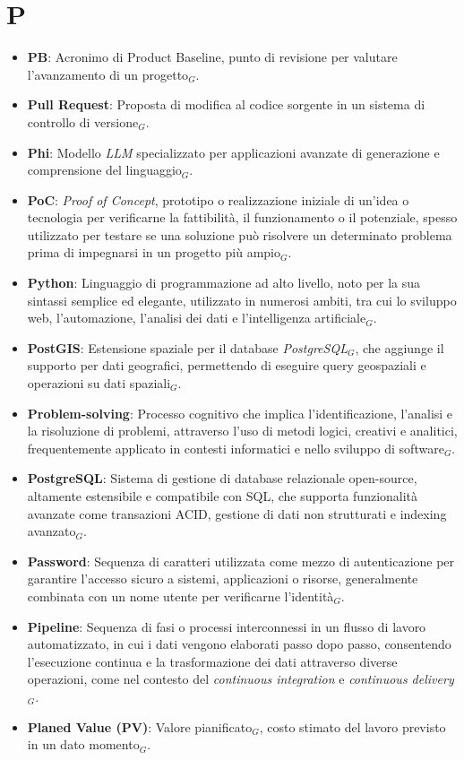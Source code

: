 \section{P}
\begin{itemize}
    \item \textbf{PB}: Acronimo di Product Baseline, punto di revisione per valutare l'avanzamento di un progetto$_G$.
    \item \textbf{Pull Request}: Proposta di modifica al codice sorgente in un sistema di controllo di versione$_G$.
    \item \textbf{Phi}: Modello \textit{LLM} specializzato per applicazioni avanzate di generazione e comprensione del linguaggio$_G$.
    \item \textbf{PoC}: \textit{Proof of Concept}, prototipo o realizzazione iniziale di un'idea o tecnologia per verificarne la fattibilità, il funzionamento o il potenziale, spesso utilizzato per testare se una soluzione può risolvere un determinato problema prima di impegnarsi in un progetto più ampio$_G$.
    \item \textbf{Python}: Linguaggio di programmazione ad alto livello, noto per la sua sintassi semplice ed elegante, utilizzato in numerosi ambiti, tra cui lo sviluppo web, l'automazione, l'analisi dei dati e l'intelligenza artificiale$_G$.
    \item \textbf{PostGIS}: Estensione spaziale per il database \textit{PostgreSQL}$_G$, che aggiunge il supporto per dati geografici, permettendo di eseguire query geospaziali e operazioni su dati spaziali$_G$.
    \item \textbf{Problem-solving}: Processo cognitivo che implica l'identificazione, l'analisi e la risoluzione di problemi, attraverso l'uso di metodi logici, creativi e analitici, frequentemente applicato in contesti informatici e nello sviluppo di software$_G$.
    \item \textbf{PostgreSQL}: Sistema di gestione di database relazionale open-source, altamente estensibile e compatibile con SQL, che supporta funzionalità avanzate come transazioni ACID, gestione di dati non strutturati e indexing avanzato$_G$.
    \item \textbf{Password}: Sequenza di caratteri utilizzata come mezzo di autenticazione per garantire l'accesso sicuro a sistemi, applicazioni o risorse, generalmente combinata con un nome utente per verificarne l'identità$_G$.
    \item \textbf{Pipeline}: Sequenza di fasi o processi interconnessi in un flusso di lavoro automatizzato, in cui i dati vengono elaborati passo dopo passo, consentendo l'esecuzione continua e la trasformazione dei dati attraverso diverse operazioni, come nel contesto del \textit{continuous integration} e \textit{continuous delivery}$_G$.
    \item \textbf{Planed Value (PV)}: Valore pianificato$_G$, costo stimato del lavoro previsto in un dato momento$_G$.
\end{itemize}
